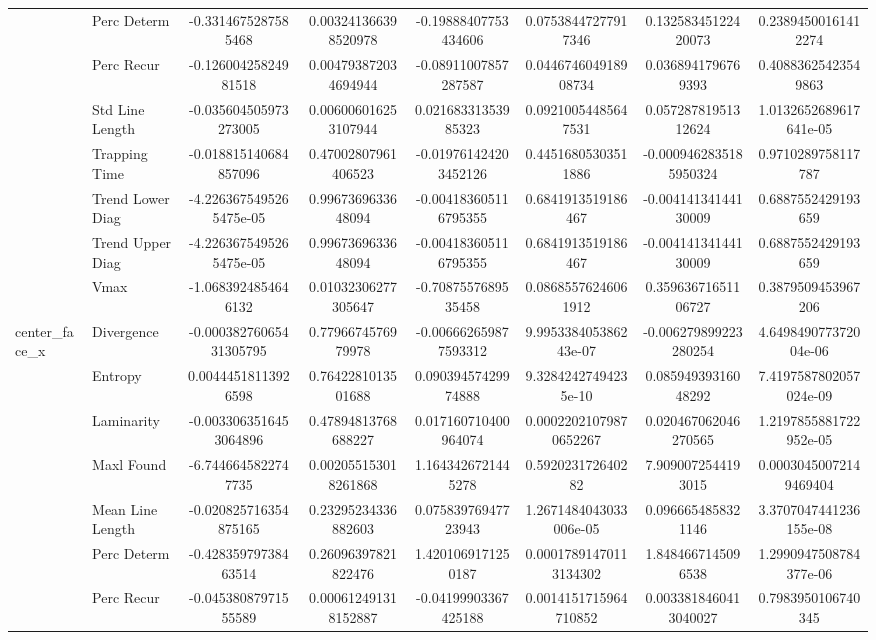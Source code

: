 \begin{tabular}{llcc|cc|cc}
 & Perc Determ & -0.3314675287585468 & 0.003241366398520978 & -0.19888407753434606 & 0.07538447277917346 & 0.13258345122420073 & 0.23894500161412274 \\
 & Perc Recur & -0.12600425824981518 & 0.004793872034694944 & -0.08911007857287587 & 0.044674604918908734 & 0.0368941796769393 & 0.40883625423549863 \\
 & Std Line Length & -0.035604505973273005 & 0.006006016253107944 & 0.02168331353985323 & 0.09210054485647531 & 0.05728781951312624 & 1.0132652689617641e-05 \\
 & Trapping Time & -0.018815140684857096 & 0.47002807961406523 & -0.019761424203452126 & 0.44516805303511886 & -0.0009462835185950324 & 0.9710289758117787 \\
 & Trend Lower Diag & -4.2263675495265475e-05 & 0.9967369633648094 & -0.004183605116795355 & 0.6841913519186467 & -0.00414134144130009 & 0.6887552429193659 \\
 & Trend Upper Diag & -4.2263675495265475e-05 & 0.9967369633648094 & -0.004183605116795355 & 0.6841913519186467 & -0.00414134144130009 & 0.6887552429193659 \\
 & Vmax & -1.0683924854646132 & 0.01032306277305647 & -0.7087557689535458 & 0.08685576246061912 & 0.35963671651106727 & 0.3879509453967206 \\
\midrule
\multirow{12}{*}{center_face_x} & Divergence & -0.00038276065431305795 & 0.7796674576979978 & -0.006662659877593312 & 9.995338405386243e-07 & -0.006279899223280254 & 4.649849077372004e-06 \\
 & Entropy & 0.00444518113926598 & 0.7642281013501688 & 0.09039457429974888 & 9.32842427494235e-10 & 0.08594939316048292 & 7.4197587802057024e-09 \\
 & Laminarity & -0.0033063516453064896 & 0.47894813768688227 & 0.017160710400964074 & 0.00022021079870652267 & 0.020467062046270565 & 1.2197855881722952e-05 \\
 & Maxl Found & -6.7446645822747735 & 0.002055153018261868 & 1.1643426721445278 & 0.592023172640282 & 7.9090072544193015 & 0.00030450072149469404 \\
 & Mean Line Length & -0.020825716354875165 & 0.23295234336882603 & 0.07583976947723943 & 1.2671484043033006e-05 & 0.0966654858321146 & 3.3707047441236155e-08 \\
 & Perc Determ & -0.42835979738463514 & 0.26096397821822476 & 1.4201069171250187 & 0.00017891470113134302 & 1.8484667145096538 & 1.2990947508784377e-06 \\
 & Perc Recur & -0.04538087971555589 & 0.000612491318152887 & -0.04199903367425188 & 0.0014151715964710852 & 0.0033818460413040027 & 0.7983950106740345 \\

\end{tabular}
